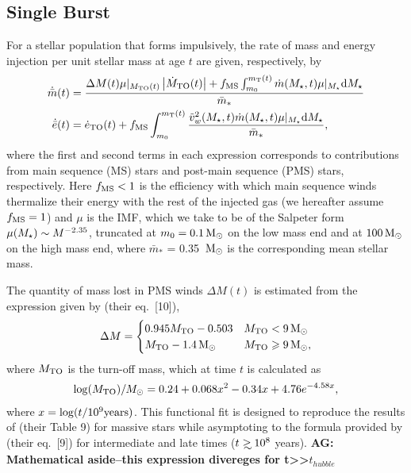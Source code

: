 \subsection{Single Burst}

For a stellar population that forms impulsively, the rate of mass and energy injection per unit stellar mass at age $t$ are given, respectively, by 
\begin{align} 
  \dot{\bar{m}}(t) &= \frac{\Delta M(t) \mu|_{M_{\rm TO}(t)}
    \left|\dot{M}_{\rm TO}(t)\right| + f_{\rm MS} \int_{m_0}^{m_{\rm
        T}(t)}
    \dot{m}(M_{\star}, t) \mu|_{M_{\star}} {\rm d}M_{\star} }{\bar{m}_*}\\
  \dot{\bar{e}}(t) &=\dot{e}_{\rm TO}(t)+ f_{\rm MS} \int_{m_0}^{m_{\rm T}(t)}
  \frac{\tilde{v}_{w}^2(M_{\star}, t) \dot{m}(M_{\star}, t) \mu|_{M_{\star}} {\rm d}M_{\star}}{\bar{m}_*},
  \label{eq:edotImp}
\end{align} 
where the first and second terms in each expression corresponds to contributions from main sequence (MS) stars and post-main sequence (PMS) stars, respectively.  Here $ f_{\rm MS} < 1$ is the efficiency with which main sequence winds thermalize their energy with the rest of the injected gas (we hereafter assume $f_{\rm MS} = 1$) and $\mu$ is the IMF, which we take to be of the Salpeter form $\mu(M_{\star})\sim M^{-2.35}$, truncated at $m_0 = 0.1 \,{\rm M_\odot}$ on the low mass end and at $100 \,{\rm M_\odot}$ on the high mass end, where $\bar{m}_*$ = 0.35 $\,{\rm M_\odot}$ is the corresponding mean stellar mass.  

The quantity of mass lost in PMS winds $\Delta M(t)$ is estimated from the expression given by \citet{CiottiOstriker:2007a} (their eq.~[10]),
\begin{align}
\Delta M=
\begin{cases}
0.945 M_{\rm TO}-0.503 & M_{\rm TO} < 9 \,{\rm M_\odot}\\
 M_{\rm TO}-1.4 \,{\rm M_\odot} &  M_{\rm TO} \geqslant 9 \,{\rm M_\odot},
\end{cases}
\end{align}
where $M_{\rm TO}$ is the turn-off mass, which at time $t$ is calculated as
\begin{align}
\log(M_{\rm TO})/M_{\odot} =0.24 + 0.068 x^2-0.34 x+4.76 e^{-4.58 x},
\end{align}
where $x=\log(t/10^9 {\rm years})$.  This functional fit is designed
to reproduce the results of \citet{MaederMeynet:1987a} (their Table 9)
for massive stars while asymptoting to the formula provided by
\citet{CiottiOstriker:2007a} (their eq.~[9]) for intermediate and late
times ($t \gsim 10^8$ years). {\bf AG: Mathematical aside--this
  expression divereges for t>>$t_{hubble}$}

